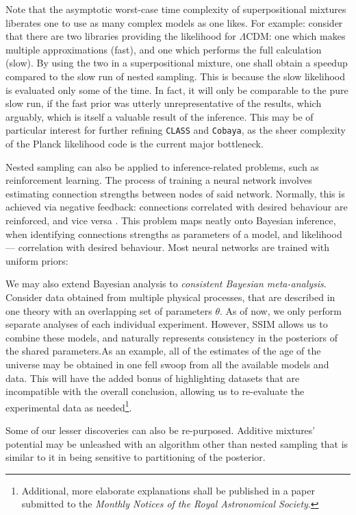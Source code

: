 \documentclass[usenatbib]{mnras}
\begin{document}
Note that the asymptotic worst-case time complexity of superpositional
mixtures liberates one to use as many complex models as one likes. For
example: consider that there are two libraries providing the
likelihood for \(\Lambda\)CDM: one which makes multiple approximations
(fast), and one which performs the full calculation (slow). By using
the two in a superpositional mixture, one shall obtain a speedup
compared to the slow run of nested sampling. This is because the slow
likelihood is evaluated only some of the time. In fact, it will only
be comparable to the pure slow run, if the fast prior was utterly
unrepresentative of the results, which arguably, which is itself a
valuable result of the inference. This may be of particular interest
for further refining \texttt{CLASS} and \texttt{Cobaya}, as the sheer
complexity of the Planck likelihood code is the current major
bottleneck.

Nested sampling can also be applied to inference-related problems,
such as reinforcement learning. The process of training a neural
network involves estimating connection strengths between nodes of said
network. Normally, this is achieved via negative feedback: connections
correlated with desired behaviour are reinforced, and vice versa
\cite{Kaelbling_1996}. This problem maps neatly onto Bayesian
inference, when identifying connections strengths as parameters of a
model, and likelihood --- correlation with desired behaviour. Most
neural networks are trained with uniform priors:


We may also extend Bayesian analysis to \emph{consistent Bayesian
  meta-analysis}. Consider data obtained from multiple physical
processes, that are described in one theory with an overlapping set of
parameters $\theta$. As of now, we only perform separate analyses of
each individual experiment. However, SSIM allows us to combine these
models, and naturally represents consistency in the posteriors of the
shared parameters.As an example, all of the estimates of the age of
the universe may be obtained in one fell swoop from all the available
models and data. This will have the added bonus of highlighting
datasets that are incompatible with the overall conclusion, allowing
us to re-evaluate the experimental data as needed\footnote{Additional,
  more elaborate explanations shall be published in a paper submitted
  to the \emph{Monthly Notices of the Royal Astronomical Society}.}.

Some of our lesser discoveries can also be re-purposed. Additive
mixtures' potential may be unleashed with an algorithm other than
nested sampling that is similar to it in being sensitive to
partitioning of the posterior.
\end{document}
